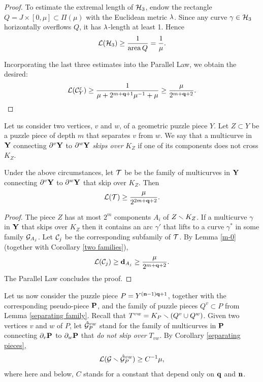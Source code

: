 \begin{proof}
To estimate the extremal length of ${\mathcal H}_3$, endow the rectangle
$Q=J \times [0,\mu]\subset \Pi(\mu)$ with the Euclidean metric ${\lambda}$.
Since  any curve $\gamma\in {\mathcal H}_3$ horizontally overflows $Q$,
it has ${\lambda}$-length at least 1. Hence
$$
   {\mathcal L}({\mathcal H}_3)\geq \frac{1}{\operatorname{area} Q}= \frac{1}{\mu}.
$$

Incorporating the last three estimates into the Parallel Law, we obtain the desired:
$$
    {\mathcal L}({\mathcal C}_Y^{\varepsilon}) \geq \frac{1}{\mu + 2^{m+{\mathbf{q}}+1}\mu^{-1} +\mu}\geq \frac{\mu}{2^{m+{\mathbf{q}}+ 2}}.
$$
%
\end{proof}

 Let us consider two vertices,  $v$ and $w$, of a geometric puzzle piece $Y$.
   Let $Z\subset Y$ be a  puzzle piece of depth $m$ that separates $v$ from $w$.
We say that a multicurve in ${\mathbf{Y}}$ connecting $\partial^v {\mathbf{Y}}$ to $\partial^w{\mathbf{Y}} $ {\it skips over} $K_Z$
if one of its components does not cross $K_Z$.

\begin{cor}\label{separating pieces}
Under the above circumstances,
let ${\mathcal T}$ be be the family of multicurves in ${\mathbf{Y}}$ connecting $\partial^v {\mathbf{Y}}$ to $\partial^w{\mathbf{Y}} $
that skip over   $K_Z$.
Then
$$
  {\mathcal L}({\mathcal T})\geq \frac{\mu}{2^{2 m+{\mathbf{q}}+2} }.
$$
\end{cor}

\begin{proof}
  The piece $Z$ has at most $2^m$ components $A_i$ of $Z\smallsetminus K_Z$.
If a multicurve $\gamma$ in ${\mathbf{Y}}$ that skips over $K_Z$
then it contains an arc $\gamma'$ that lifts to
a curve $\gamma^*$ in some family ${\mathcal G}_{A_j}$.
Let ${\mathcal C}_j$ be the corresponding subfamily of ${\mathcal T}$.
By Lemma \ref{m-0} (together with Corollary \ref{two families}),
$$
    {\mathcal L}({\mathcal C}_j) \geq {\mathbf{d}}_{A_j} \geq \frac{\mu}{2^{m+{\mathbf{q}}+2}}.
$$
The Parallel Law concludes the proof.
\end{proof}



 Let us now  consider the puzzle piece $P=Y^{({\mathbf{n}}-1){\mathbf{q}}+1}$,
together with the corresponding pseudo-piece ${\mathbf{P}}$,
and the family of puzzle pieces $Q^v\subset P$
from   Lemma \ref{separating family}.
Recall that $T^{vw}= K_P\smallsetminus (Q^v\cup Q^w)$.
Given two vertices $v$ and $w$ of $P$,
let $\hat{{\mathcal G}}_P^{vw}$ stand for the family of multicurves in ${\mathbf{P}}$ connecting $\partial_v {\mathbf{P}}$ to
$\partial_w{\mathbf{P}}$ that {\it do not  skip over} $T_{vw}$.
By Corollary \ref{separating pieces},
\begin{equation}\label{T^vw}
  {\mathcal L}({\mathcal G}\smallsetminus \hat{{\mathcal G}}_P^{vw}) \geq C^{-1} \mu,
\end{equation}
where here and below, $C$ stands for a  constant that depend only on ${\mathbf{q}}$ and ${\mathbf{n}}$.




